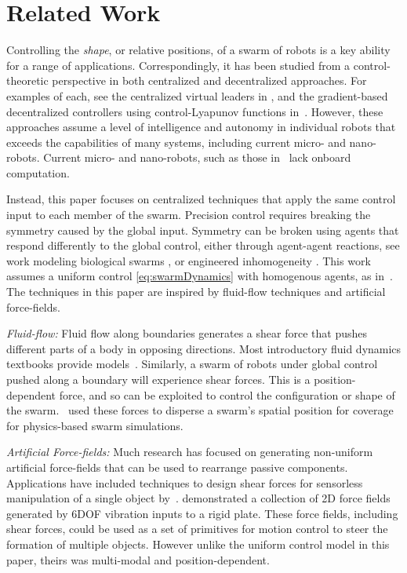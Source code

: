 
\section{Related Work}\label{sec:RelatedWork}

Controlling the \emph{shape}, or relative positions, of a swarm of robots is a key ability for a range of applications.  Correspondingly, it has been studied from a control-theoretic perspective in  both centralized and decentralized approaches. For examples of each, see the centralized virtual leaders in \citep{egerstedt2001formation}, and the  gradient-based decentralized controllers  using control-Lyapunov functions in~\citep{hsieh2008decentralized}. However, these approaches assume a level of intelligence and autonomy in individual robots that exceeds the capabilities of many systems, including current micro- and nano-robots.  Current micro- and nano-robots, such as those in~\citep{Chowdhury2015,martel2015magnetotactic,Xiaohui2015magnetiteMicroswimmers} lack onboard computation.

Instead, this paper focuses on centralized techniques that apply the same control input to each member of the swarm. 
Precision control requires breaking the symmetry caused by the global input.  
Symmetry can be broken using agents that respond differently to the global control, either through agent-agent reactions, see work modeling biological swarms \citep{bertozzi2015ring}, or engineered inhomogeneity  \citep{Donald2013,bretl2007,beckerIJRR2014}.
This work assumes a uniform control \eqref{eq:swarmDynamics}  with homogenous agents, as in~\citep{Becker2013b}. 
The techniques in this paper are inspired by fluid-flow techniques and artificial force-fields. 

\emph{Fluid-flow:} 
Fluid flow along boundaries generates a shear force that pushes different parts of a body in opposing directions. 
Most introductory fluid dynamics textbooks provide models~\citep{Munson2013}.
Similarly, a swarm of robots under global control pushed along a boundary will experience shear forces.  
This is a position-dependent force, and so can be exploited to control the configuration or shape of the swarm.  
 \citep{spears2006physics}~used these forces to disperse a swarm's spatial position for coverage for physics-based swarm simulations.

\emph{Artificial Force-fields:}
Much research has focused on generating non-uniform artificial force-fields that can be used to rearrange passive components.  Applications have included techniques to design shear forces for sensorless manipulation of a single object by~\citep{lamiraux+2001:ra}.  
\citep{Vose2009a,vose2012sliding} demonstrated a collection of 2D force fields generated by 6DOF vibration inputs to a rigid plate.  These force fields, including shear forces, could be used as a set of primitives for motion control to steer the formation of multiple objects. However unlike the uniform control model in this paper, theirs was multi-modal and position-dependent.

